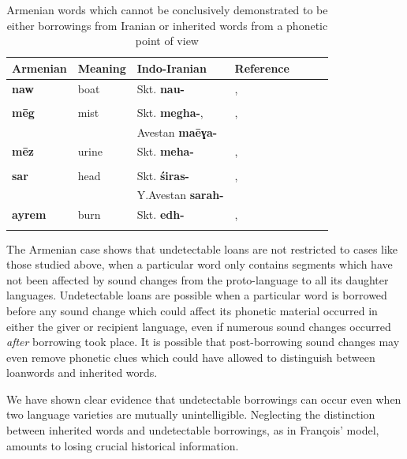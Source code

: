 \documentclass[svgnames,12pt]{scrartcl}
\newcommand{\ipa}[1]{\textbf{{\phon\mbox{#1}}}}
\begin{document}
{{\begin{table}[h]
\caption{Armenian words which cannot be conclusively demonstrated to be either borrowings from Iranian or inherited words from a phonetic point of view    } \centering \label{tab:armenian}
\begin{tabular}{lllllll}
\toprule 
Armenian & Meaning & Indo-Iranian & Reference \\
\midrule 
\ipa{naw}& boat & Skt. \ipa{nau-} & \citet[16-17;201]{huebschmann97armenische},\\
&&& \citet[466;715]{martirosyan10etymological} \\
\midrule 
\ipa{mēg}& mist & Skt. \ipa{megha-},  & \citet[474]{huebschmann97armenische},\\
&&Avestan \ipa{maēɣa-}& \citet[466;715]{martirosyan10etymological} \\
\midrule 
\ipa{mēz}& urine & Skt. \ipa{meha-} & \citet[474]{huebschmann97armenische},\\
&&& \citet[466;715]{martirosyan10etymological} \\
\midrule 
\ipa{sar}& head & Skt. \ipa{śiras-} & \citet[236;489]{huebschmann97armenische},\\
&&Y.Avestan \ipa{sarah-}& \citet[571]{martirosyan10etymological} \\
\midrule 
\ipa{ayrem}& burn & Skt. \ipa{edh-} & \citet[418]{huebschmann97armenische},\\
&&& \citet[145]{martzloff16geri} \\
\bottomrule
\end{tabular}
\end{table}
The Armenian case shows that undetectable loans are not restricted to cases like those studied above, when a particular word only contains segments which have not been affected by sound changes from the proto-language to all its daughter languages. Undetectable loans are possible when a particular word is borrowed before any sound change which could affect its phonetic material occurred in either the giver or recipient language, even if numerous sound changes occurred \textit{after} borrowing took place. It is possible that post-borrowing sound changes may even remove phonetic clues which could have allowed to distinguish between loanwords and inherited words.

 We have shown clear evidence that undetectable borrowings can occur even when two language varieties are mutually unintelligible. Neglecting the distinction between inherited words and undetectable borrowings, as in François' model, amounts to losing crucial historical information.

}}
\end{document}
